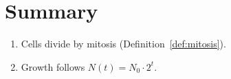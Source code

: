\section{Summary}
\begin{enumerate}
  \item Cells divide by mitosis (Definition~\ref{def:mitosis}).
  \item Growth follows $N(t) = N_0 \cdot 2^{t}$.
\end{enumerate}
